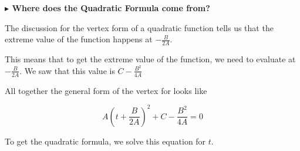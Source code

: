 \documentclass{ximera}
\begin{document}
\textbf{\textcolor{purple!85!blue}{$\blacktriangleright$ Where does the Quadratic Formula come from?}} 


The discussion for the vertex form of a quadratic function tells us that the extreme value of the function happens at $-\frac{B}{2A}$.

This means that to get the extreme value of the function, we need to evaluate at $-\frac{B}{2A}$. We saw that this value is $C - \frac{B^2}{4A}$


All together the general form of the vertex for looks like














\[ A\left(t + \frac{B}{2 A}\right)^2 + C - \frac{B^2}{4 A}  = 0\]

To get the quadratic formula, we solve this equation for $t$.
\end{document}

